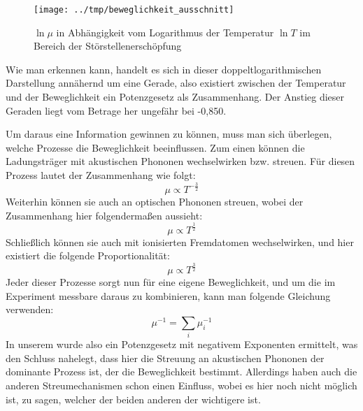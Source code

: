 \begin{figure}[htb]
   \centering
   \texttt{[image: ../tmp/beweglichkeit\_ausschnitt]}
   \caption{$\ln μ$ in Abhängigkeit vom Logarithmus der Temperatur $\ln T$ im Bereich der Störstellenerschöpfung}
   \label{fig:beweglichkeit_ausschnitt}
\end{figure}

Wie man erkennen kann, handelt es sich in dieser doppeltlogarithmischen
Darstellung annähernd um eine Gerade, also existiert zwischen der Temperatur
und der Beweglichkeit ein Potenzgesetz als Zusammenhang. Der Anstieg dieser
Geraden liegt vom Betrage her ungefähr bei -0,850.

Um daraus eine Information gewinnen zu können, muss man sich überlegen, welche
Prozesse die Beweglichkeit beeinflussen. Zum einen können die Ladungsträger mit
akustischen Phononen wechselwirken bzw. streuen. Für diesen Prozess lautet der
Zusammenhang wie folgt:
\begin{equation}
μ \propto T^{-\frac{3}{2}}
\end{equation}
Weiterhin können sie auch an optischen Phononen streuen, wobei der Zusammenhang
hier folgendermaßen aussieht:
\begin{equation}
μ \propto T^{\frac{1}{2}}
\end{equation}
Schließlich können sie auch mit ionisierten Fremdatomen wechselwirken, und hier
existiert die folgende Proportionalität:
\begin{equation}
μ \propto T^{\frac{3}{2}}
\end{equation}
Jeder dieser Prozesse sorgt nun für eine eigene Beweglichkeit, und um die im
Experiment messbare daraus zu kombinieren, kann man folgende Gleichung
verwenden:
\begin{equation}
μ^{-1} = \sum_i μ_i^{-1}
\end{equation}
In unserem wurde also ein Potenzgesetz mit negativem Exponenten ermittelt, was
den Schluss nahelegt, dass hier die Streuung an akustischen Phononen der
dominante Prozess ist, der die Beweglichkeit bestimmt. Allerdings haben auch
die anderen Streumechanismen schon einen Einfluss, wobei es hier noch nicht
möglich ist, zu sagen, welcher der beiden anderen der wichtigere ist.
